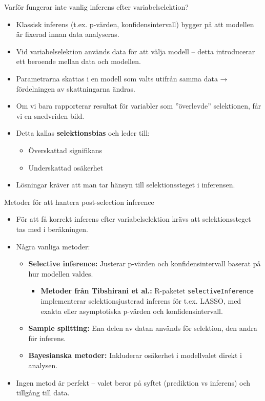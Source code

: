 \documentclass[10pt,english]{beamer}
\begin{document}
\begin{frame}{Varför fungerar inte vanlig inferens efter variabelselektion?}
\begin{itemize}
    \item Klassisk inferens (t.ex. p-värden, konfidensintervall) bygger på att modellen är fixerad innan data analyseras.
    \item Vid variabelselektion används data för att välja modell – detta introducerar ett beroende mellan data och modellen.
    \item Parametrarna skattas i en modell som valts utifrån samma data → fördelningen av skattningarna ändras.
    \item Om vi bara rapporterar resultat för variabler som ”överlevde” selektionen, får vi en snedvriden bild.
    \item Detta kallas \textbf{selektionsbias} och leder till:
    \begin{itemize}
        \item Överskattad signifikans
        \item Underskattad osäkerhet
    \end{itemize}
    \item Lösningar kräver att man tar hänsyn till selektionssteget i inferensen.
\end{itemize}
\end{frame}

\begin{frame}{Metoder för att hantera post-selection inference}
\begin{itemize}
    \item För att få korrekt inferens efter variabelselektion krävs att selektionssteget tas med i beräkningen.
    \item Några vanliga metoder:
    \begin{itemize}
        \item \textbf{Selective inference:} Justerar p-värden och konfidensintervall baserat på hur modellen valdes.
        \begin{itemize}
          \item \textbf{Metoder från Tibshirani et al.:} R-paketet \texttt{selectiveInference} implementerar selektionsjusterad inferens för t.ex. LASSO, med exakta eller asymptotiska p-värden och konfidensintervall.
        \end{itemize}
        \item \textbf{Sample splitting:} Ena delen av datan används för selektion, den andra för inferens.
         \item \textbf{Bayesianska metoder:} Inkluderar osäkerhet i modellvalet direkt i analysen.
    \end{itemize}
    \item Ingen metod är perfekt – valet beror på syftet (prediktion vs inferens) och tillgång till data.
\end{itemize}
\end{frame}
\end{document}
